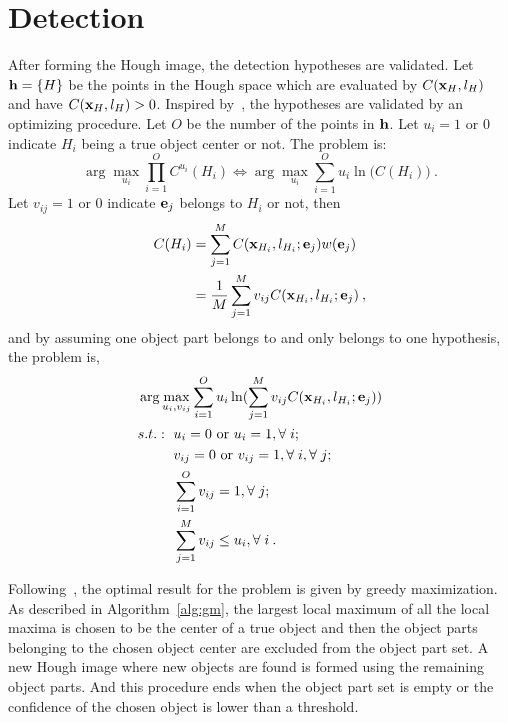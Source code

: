 \section{Detection}
\label{det4}
After forming the Hough image, the detection hypotheses are validated. Let ${\bf{h}}=\{ H \}$ be the points in the Hough space which are evaluated by $C({\bf{x}}_{H},l_{H})$ and have $C({\bf{x}}_{H},l_{H})>0$.  Inspired by~\cite{ac9}, the hypotheses are validated by an optimizing procedure. Let $O$ be the number of the points in ${\bf{h}}$. Let $u_i=1\mbox{ or } 0$ indicate $H_i$ being a true object center or not. The problem is:
\[
\arg \max\limits_{u_i} \prod\limits_{i = 1}^O { C^{u_i}({H_i})} \Longleftrightarrow\arg \max\limits_{u_i} \sum\limits_{i = 1}^O {{u_i}\ln (C({H_i})} )\:.
\]
Let $v_{ij}=1\mbox{ or } 0$ indicate ${\bf{e}}_j$ belongs to $H_i$ or not, then
\[
\begin{aligned}
C(H_i)&=\sum\limits^M_{j=1} C({\bf{x}}_{H_i},l_{H_i};{\bf{e}}_j)w({\bf{e}}_j)\\
&=\frac 1 M \sum\limits^M_{j=1} v_{ij} C({\bf{x}}_{H_i},l_{H_i};{\bf{e}}_j)\:,
\end{aligned}
\]
and by assuming one object part belongs to and only belongs to one hypothesis, the problem is,
\[
\begin{aligned}
&\arg \max\limits_{u_i,v_{ij}} \sum\limits_{i = 1}^O {{u_i}\ln (\sum\limits^M_{j=1} v_{ij} C({\bf{x}}_{H_i},l_{H_i};{\bf{e}}_j)} )\\
&
\begin{aligned}
    s.t.:\mbox{ }&u_i=0\mbox{ or }u_i=1,\forall\;i;\\
    &v_{ij}=0\mbox{ or }v_{ij}=1,\forall\;i,\forall\;j;\\
    &\sum\limits_{i = 1}^O {v_{ij}}=1,\forall\;j;\;\;  \\
    &\sum\limits_{j = 1}^M {v_{ij}}\leq u_i,\forall\;i\:.
\end{aligned}
\end{aligned}
\]


Following~\cite{ac9}, the optimal result for the problem is given by greedy maximization. As described in Algorithm~\ref{alg:gm}, the largest local maximum of all the local maxima is chosen to be the center of a true object and then the object parts belonging to the chosen object center are excluded from the object part set. A new Hough image where new objects are found is formed using the remaining object parts. And this procedure ends when the object part set is empty or the confidence of the chosen object is lower than a threshold.

